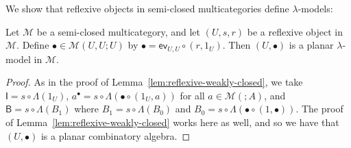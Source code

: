 \documentclass{llncs}
\begin{document}
We show that reflexive objects in semi-closed multicategories define $\lambda$-models:
\begin{lemma}\label{lem:semi-closed-reflexive}
  Let $\mathcal{M}$ be a semi-closed multicategory, and let $(U,s,r)$ be a reflexive object in $\mathcal{M}$. Define $\bullet \in \mathcal{M}(U,U;U)$ by $\bullet = \mathsf{ev}_{U,U} \circ (r,1_U)$. Then $(U,\bullet)$ is a planar $\lambda$-model in $\mathcal{M}$.
\end{lemma}
\begin{proof}
  As in the proof of Lemma~\ref{lem:reflexive-weakly-closed}, we take $\mathsf{I} = s \circ \Lambda(1_U)$, $a^\bullet = s \circ \Lambda(\bullet \circ (1_U,a))$ for all $a \in \mathcal{M}(;A)$, and $\mathsf{B} = s \circ \Lambda(B_1)$ where $B_1 = s \circ \Lambda(B_0)$ and $B_0 = s \circ \Lambda(\bullet \circ (1,\bullet))$. The proof of Lemma~\ref{lem:reflexive-weakly-closed} works here as well, and so we have that $(U,\bullet)$ is a planar combinatory algebra.


\end{proof}
\end{document}
